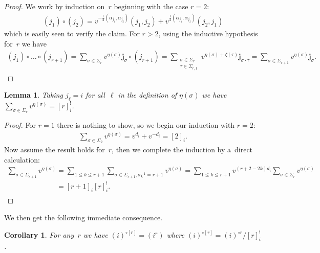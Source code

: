 \documentclass[pdftex]{sigma}
\numberwithin{equation}{section}
\newtheorem{Corollary}[Theorem]{Corollary}
\newtheorem{Lemma}[Theorem]{Lemma}
\begin{document}
\begin{proof}
We work by induction on~$r$ beginning with the case $r=2$:
\begin{gather*}
(j_1)\circ(j_2)=v^{-\frac{1}{2}(\alpha_{j_1},\alpha_{j_2})}(j_1,j_2)+v^{\frac{1}{2}(\alpha_{j_1},\alpha_{j_2})}(j_2,j_1) %
\end{gather*}
which is easily seen to verify the claim.
For $r>2$, using the inductive hypothesis for~$r$ we have
\begin{gather*}
(j_1)\circ\dots\circ(j_{r+1})=\sum\limits_{\sigma\in\Sigma_r}v^{\eta(\sigma)}\mathbf{j}_\sigma\circ(j_{r+1})
=\sum\limits_{\substack{\sigma\in\Sigma_r\\ \tau\in\Sigma_{r,1}}}v^{\eta(\sigma)+\zeta(\tau)}\mathbf{j}_{\tilde\sigma\cdot\tau}
=\sum\limits_{\sigma\in\Sigma_{r+1}}v^{\eta(\sigma)}\mathbf{j}_\sigma.  \tag*{\qed}
\end{gather*}
\renewcommand{\qed}{}
\end{proof}


\begin{Lemma}
Taking $j_\ell=i$ for all~$\ell$ in the definition of $\eta(\sigma)$ we have
$\sum\limits_{\sigma\in\Sigma_r}v^{\eta(\sigma)}=[r]_i^!$.
\end{Lemma}
\begin{proof}
For $r=1$ there is nothing to show, so we begin our induction with $r=2$:
\begin{gather*}
\sum\limits_{\sigma\in\Sigma_2}v^{\eta(\sigma)}=v^{d_i}+v^{-d_i}=[2]_i.
\end{gather*}
Now assume the result holds for~$r$, then we complete the induction by a~direct calculation:
\begin{gather*}
\sum\limits_{\sigma\in\Sigma_{r+1}}v^{\eta(\sigma)}
=\sum\limits_{1\le k\le r+1}\sum\limits_{\sigma\in\Sigma_{r+1},\sigma_k^{-1}=r+1}v^{\eta(\sigma)}
 =\sum\limits_{1\le k\le r+1}v^{(r+2-2k)d_i}\sum\limits_{\sigma\in\Sigma_r}v^{\eta(\sigma)}
\\
\phantom{\sum\limits_{\sigma\in\Sigma_{r+1}}v^{\eta(\sigma)}}
 =[r+1]_i[r]_i^!.  \tag*{\qed}
\end{gather*}
\renewcommand{\qed}{}
\end{proof}


We then get the following immediate consequence.
\begin{Corollary}
\label{cor:shuffle_divided_power}
For any~$r$ we have $(i)^{\circ[r]}=(i^r)$ where $(i)^{\circ[r]}=(i)^{\circ r}/[r]_i^!$.  %
\end{Corollary}
\end{document}
